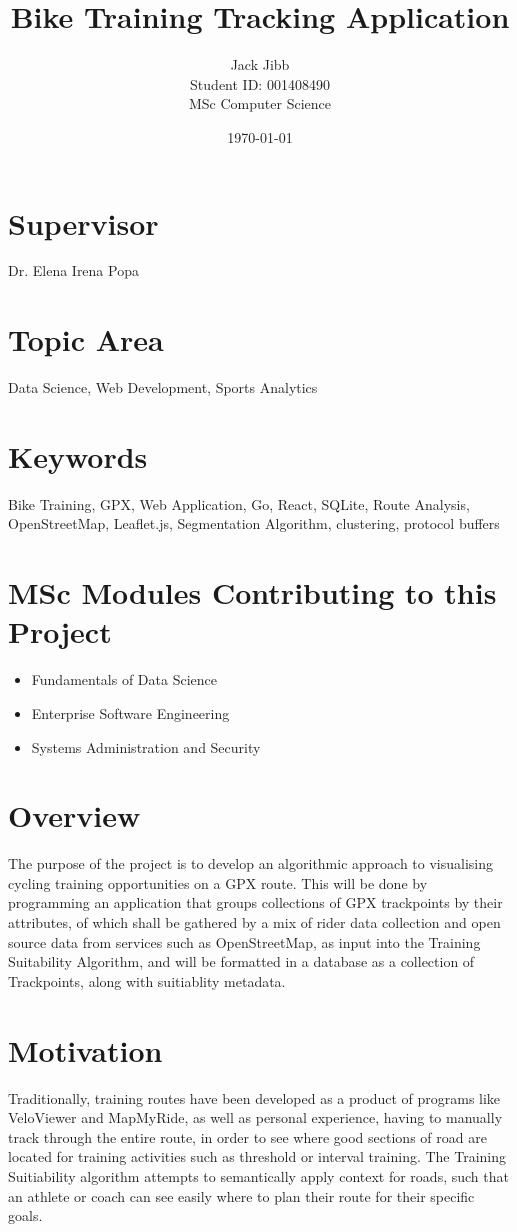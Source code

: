 \documentclass{article}
\title{Bike Training Tracking Application}
\author{Jack Jibb\\ Student ID: 001408490 \\ MSc Computer Science}
\date{\today}
\begin{document}
\maketitle

\section*{Supervisor}
Dr. Elena Irena Popa

\section*{Topic Area}
Data Science, Web Development, Sports Analytics

\section*{Keywords}
Bike Training, GPX, Web Application, Go, React, SQLite, Route Analysis, OpenStreetMap, Leaflet.js, Segmentation Algorithm, clustering, protocol buffers 

\section*{MSc Modules Contributing to this Project}
\begin {itemize}
  \item Fundamentals of Data Science
  \item Enterprise Software Engineering
  \item Systems Administration and Security
\end{itemize}

\section{Overview}
  The purpose of the project is to develop an algorithmic approach to visualising cycling training opportunities on a GPX route. This will be done by programming
  an application that groups collections of GPX trackpoints by their attributes, of which shall be gathered by a mix of rider data collection and 
    open source data from services such as OpenStreetMap, as input into the Training Suitability Algorithm, and will be formatted in a database as a collection of Trackpoints, along with suitiablity metadata.
\section{Motivation}
  Traditionally, training routes have been developed as a product of programs like VeloViewer and MapMyRide, as well as personal experience, having to manually track through
  the entire route, in order to see where good sections of road are located for training activities such as threshold or interval training. The Training Suitiability algorithm attempts to semantically apply context
  for roads, such that an athlete or coach can see easily where to plan their route for their specific goals.
\end{document}
